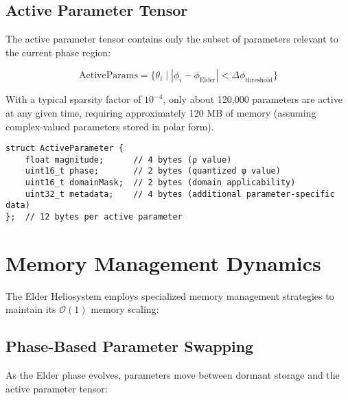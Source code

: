 \subsection{Active Parameter Tensor}

The active parameter tensor contains only the subset of parameters relevant to the current phase region:

\begin{equation}
\text{ActiveParams} = \{ \theta_i \mid |\phi_i - \phi_{\text{Elder}}| < \Delta\phi_{\text{threshold}} \}
\end{equation}

With a typical sparsity factor of $10^{-4}$, only about 120,000 parameters are active at any given time, requiring approximately 120 MB of memory (assuming complex-valued parameters stored in polar form).

\begin{tcolorbox}[colback=LightGray, colframe=DarkGray, title=Active Parameter Representation, fonttitle=\bfseries]
\begin{verbatim}
struct ActiveParameter {
    float magnitude;      // 4 bytes (ρ value)
    uint16_t phase;       // 2 bytes (quantized φ value)
    uint16_t domainMask;  // 2 bytes (domain applicability)
    uint32_t metadata;    // 4 bytes (additional parameter-specific data)
};  // 12 bytes per active parameter
\end{verbatim}
\end{tcolorbox}

\section{Memory Management Dynamics}

The Elder Heliosystem employs specialized memory management strategies to maintain its $\mathcal{O}(1)$ memory scaling:

\subsection{Phase-Based Parameter Swapping}

As the Elder phase evolves, parameters move between dormant storage and the active parameter tensor:

